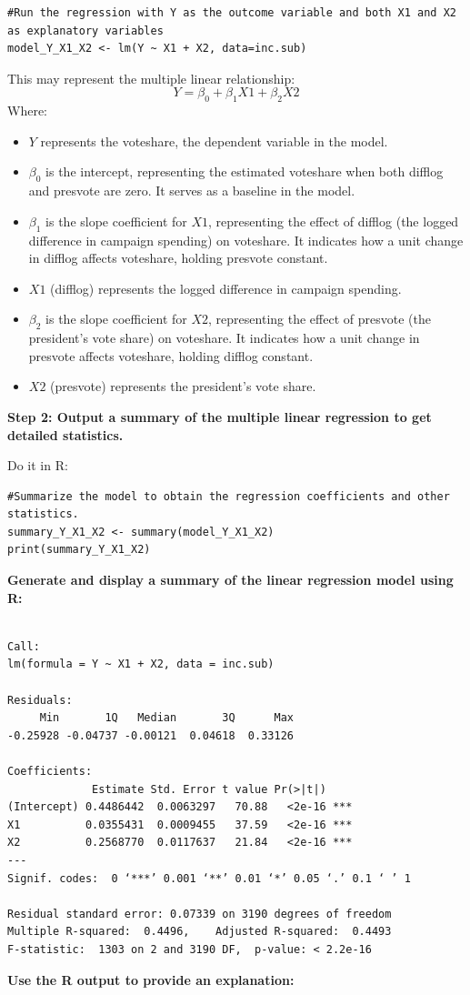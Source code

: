\documentclass[12pt]{article}
\begin{document}
\begin{lstlisting}
#Run the regression with Y as the outcome variable and both X1 and X2 as explanatory variables
model_Y_X1_X2 <- lm(Y ~ X1 + X2, data=inc.sub)
\end{lstlisting}
This may represent the multiple linear relationship:
\begin{equation}
    Y = \beta_0 + \beta_1 X1 + \beta_2 X2
\end{equation}
Where:
\begin{itemize}
    \item $Y$ represents the voteshare, the dependent variable in the model.
    \item $\beta_0$ is the intercept, representing the estimated voteshare when both difflog and presvote are zero. It serves as a baseline in the model.
    \item $\beta_1$ is the slope coefficient for $X1$, representing the effect of difflog (the logged difference in campaign spending) on voteshare. It indicates how a unit change in difflog affects voteshare, holding presvote constant.
    \item $X1$ (difflog) represents the logged difference in campaign spending.
    \item $\beta_2$ is the slope coefficient for $X2$, representing the effect of presvote (the president's vote share) on voteshare. It indicates how a unit change in presvote affects voteshare, holding difflog constant.
    \item $X2$ (presvote) represents the president's vote share.
\end{itemize}
\textbf{Step 2: Output a summary of the multiple linear regression to get detailed statistics.}

Do it in R:
\begin{lstlisting}
#Summarize the model to obtain the regression coefficients and other statistics.
summary_Y_X1_X2 <- summary(model_Y_X1_X2)
print(summary_Y_X1_X2)
\end{lstlisting}
\textbf{Generate and display a summary of the linear regression model using R:}

\begin{center}
\begin{BVerbatim}

Call:
lm(formula = Y ~ X1 + X2, data = inc.sub)

Residuals:
     Min       1Q   Median       3Q      Max 
-0.25928 -0.04737 -0.00121  0.04618  0.33126 

Coefficients:
             Estimate Std. Error t value Pr(>|t|)    
(Intercept) 0.4486442  0.0063297   70.88   <2e-16 ***
X1          0.0355431  0.0009455   37.59   <2e-16 ***
X2          0.2568770  0.0117637   21.84   <2e-16 ***
---
Signif. codes:  0 ‘***’ 0.001 ‘**’ 0.01 ‘*’ 0.05 ‘.’ 0.1 ‘ ’ 1

Residual standard error: 0.07339 on 3190 degrees of freedom
Multiple R-squared:  0.4496,	Adjusted R-squared:  0.4493 
F-statistic:  1303 on 2 and 3190 DF,  p-value: < 2.2e-16
\end{BVerbatim}
\end{center}
\nopagebreak
\textbf{Use the R output to provide an explanation:}
\end{document}
